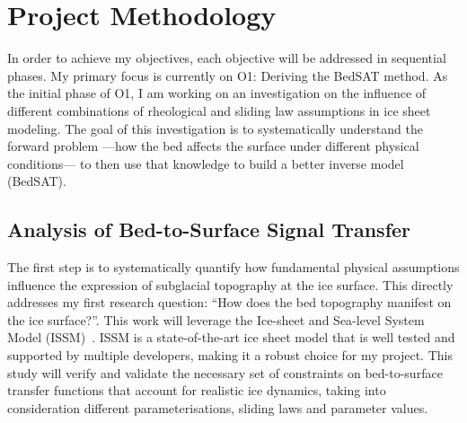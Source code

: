 \chapter{Project Methodology}

In order to achieve my objectives, each objective will be addressed in sequential phases. My primary focus is currently on O1: Deriving the BedSAT method. As the initial phase of O1, I am working on an investigation on the influence of different combinations of rheological and sliding law assumptions in ice sheet modeling. The goal of this investigation is to systematically understand the forward problem —how the bed affects the surface under different physical conditions— to then use that knowledge to build a better inverse model (BedSAT).

\section{Analysis of Bed-to-Surface Signal Transfer}\label{paper1}
The first step is to systematically quantify how fundamental physical assumptions influence the expression of subglacial topography at the ice surface.
This directly addresses my first research question: ``How does the bed topography manifest on the ice surface?''. This work will leverage the Ice-sheet and Sea-level System Model (ISSM)~\cite{Larour_2012}. ISSM is a state-of-the-art ice sheet model that is well tested and supported by multiple developers, making it a robust choice for my project. 
This study will verify and validate the necessary set of constraints on bed-to-surface transfer functions that account for realistic ice dynamics, taking into consideration different parameterisations, sliding laws and parameter values.

